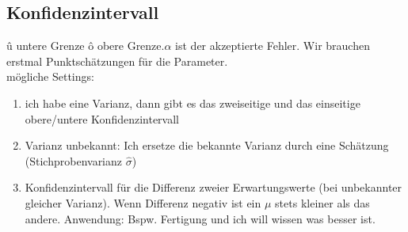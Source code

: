 \documentclass[10pt,a4paper]{article}
\begin{document}
\subsection{Konfidenzintervall}
û untere Grenze ô obere Grenze.$\alpha$ ist der akzeptierte Fehler. Wir brauchen erstmal Punktschätzungen für die Parameter.\\
mögliche Settings:
\begin{enumerate}
	\item ich habe eine Varianz, dann gibt es das zweiseitige und das einseitige obere/untere Konfidenzintervall
	\item Varianz unbekannt: Ich ersetze die bekannte Varianz durch eine Schätzung (Stichprobenvarianz $\hat{\sigma}$)
	\item Konfidenzintervall für die Differenz zweier Erwartungswerte (bei unbekannter gleicher Varianz). Wenn Differenz negativ ist ein $\mu$ stets kleiner als das andere. Anwendung: Bspw. Fertigung und ich will wissen was besser ist.
\end{enumerate}
\end{document}

